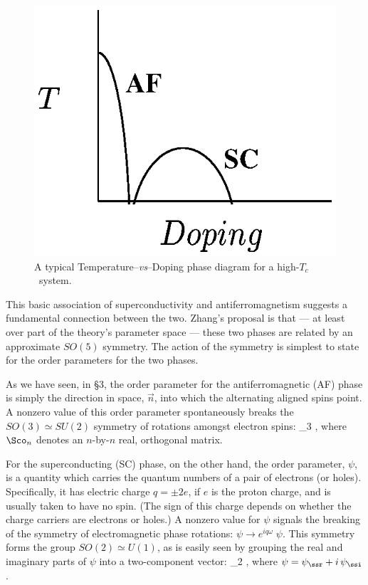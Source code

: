 \documentclass[12pt]{report}
\def\Tc{$T_c$}
\begin{document}
\begin{figure}
\includegraphics{Pdiag.eps}
\caption{A typical Temperature--{\it vs}--Doping phase
diagram for a high-\Tc\ system.}
\end{figure}


This basic association of superconductivity and 
antiferromagnetism suggests a fundamental  connection
between the two. Zhang's proposal is that --- at least over
part of the theory's parameter  space --- these two phases
are related by an approximate  $SO(5)$ symmetry. The action
of the symmetry is simplest to state for the order
parameters for the two phases.

As we have seen, in \S3, the order parameter for the
antiferromagnetic (AF) phase is simply the direction in
space, 
$\vec n$, into which the alternating aligned spins point. A
nonzero value of this order parameter spontaneously breaks
the $SO(3) 
\simeq SU(2)$ symmetry of rotations amongst electron spins: 
%
\eq
\label{sothreedef}
\to \Sco_3  \;  ,
\eeq
%
where $\Sco_n$ denotes an $n$-by-$n$ real, orthogonal
matrix.

For the superconducting (SC) phase, on the other hand, the
order parameter, $\psi$, is a quantity which carries the
quantum numbers of a pair of electrons (or holes).
Specifically, it has electric charge $q =  \pm2 e$, if $e$
is the proton charge, and is usually taken to have no
spin.  (The sign of this charge depends on whether the
charge carriers are electrons or holes.) A nonzero value
for $\psi$ signals the breaking of the symmetry of
electromagnetic phase rotations:  $\psi \to e^{iq \omega}
\; \psi$. This symmetry forms the group $SO(2) \simeq
U(1)$, as is easily seen by grouping the real and imaginary
parts of $\psi$ into a two-component vector:
%
\eq
\label{sotwodef}
\pmatrix{\psi_\ssr \cr \psi_\ssi \cr} \to 
\Sco_2  \; \pmatrix{\psi_\ssr \cr
\psi_\ssi \cr} ,  \eeq
%
where $\psi = \psi_\ssr + i \, \psi_\ssi$.
\end{document}

